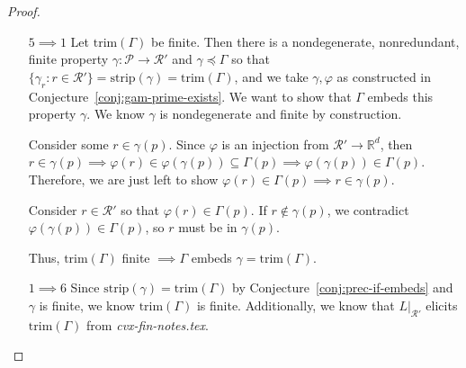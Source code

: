 \documentclass[12pt]{article}
\newcommand{\Comments}{1}
\newcommand{\mynote}[2]{\ifnum\Comments=1\textcolor{#1}{#2}\fi}
\newcommand{\jessie}[1]{\mynote{purple}{[JF: #1]}}
\newcommand{\reals}{\mathbb{R}}
\renewcommand{\P}{\mathcal{P}}
\newcommand{\R}{\mathcal{R}}
\newcommand{\trim}{\mathrm{trim}}
\newcommand{\strip}{\mathrm{strip}}
\newcommand{\card}{\textbf{card}}
\begin{document}
\begin{proof}
\begin{enumerate}
\item[$5 \implies 1$] Let $\trim(\Gamma)$ be finite.
Then there is a nondegenerate, nonredundant, finite property $\gamma: \P \to \R'$ and $\gamma \preceq \Gamma$ so that $\{ \gamma_r : r \in \R' \} = \strip(\gamma) = \trim(\Gamma)$, and we take $\gamma, \varphi$ as constructed in Conjecture~\ref{conj:gam-prime-exists}.
We want to show that $\Gamma$ embeds this property $\gamma$.
We know $\gamma$ is nondegenerate and finite by construction.


Consider some $r \in \gamma(p)$.
Since $\varphi$ is an injection from $\R' \to \reals^d$, then $r \in \gamma(p) \implies \varphi(r) \in \varphi(\gamma(p)) \subseteq \Gamma(p) \implies \varphi(\gamma(p)) \in \Gamma(p)$.
Therefore, we are just left to show $\varphi(r) \in \Gamma(p) \implies r \in \gamma(p)$.

Consider $r \in \R'$ so that $\varphi(r) \in \Gamma(p)$.
If $r \not \in \gamma(p)$, we contradict $\varphi(\gamma(p)) \in \Gamma(p)$, so $r$ must be in $\gamma(p)$.

Thus, $\trim(\Gamma)$ finite $\implies \Gamma$ embeds $\gamma = \trim(\Gamma)$.



%


\item [$1 \implies 6$]
Since $\strip(\gamma) = \trim(\Gamma)$ by Conjecture~\ref{conj:prec-if-embeds} and $\gamma$ is finite, we know $\trim(\Gamma)$ is finite.
Additionally, we know that $L|_{\R'}$ elicits $\trim(\Gamma)$ from \emph{cvx-fin-notes.tex}.


\end{enumerate}
\end{proof}
\end{document}
